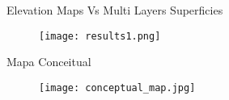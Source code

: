 



\begin{frame}[t]{Elevation Maps Vs Multi Layers Superficies}
    
    
    \begin{figure}

        \texttt{[image: results1.png]}%
        
    
    \end{figure}
\end{frame}

\begin{frame}[t]{Mapa Conceitual}
 
    \begin{figure}

        \texttt{[image: conceptual\_map.jpg]}%
        
    
    \end{figure}
\end{frame}
\begin{frame}[c]{} 
    \transdissolve[duration=0.5]
   
    \begin{center}
    \end{center}
    
   
%
\end{frame}